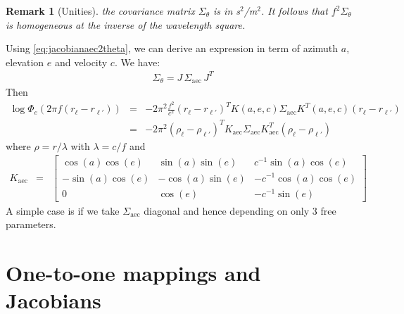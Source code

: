 \documentclass[a4paper, 12pt]{report}
\newtheorem{remark}{Remark}
\def\aec{\mathrm{aec}}
\begin{document}
\begin{remark}[Unities]
the covariance matrix $\Sigma_{\theta}$ is in s$^2$/m$^2$. It follows that $f^2 \Sigma_{\theta}$ is homogeneous at the inverse of the wavelength square.
\end{remark}


Using \eqref{eq:jacobianaec2theta}, we can derive an expression in term of azimuth $a$, elevation $e$ and velocity $c$. We have:
\begin{eqnarray}
\label{eq:theta2aec}
\Sigma_{\theta}=J\,\Sigma_{\aec}\,J^{T}
\end{eqnarray}
Then
\begin{eqnarray*}
 \log \Phi_{e}(2\pi f(r_{\ell}-r_{\ell'}))&=& 
-2\pi^2\frac{f^2}{c^2} (r_{\ell}-r_{\ell'})^TK(a,e,c)\Sigma_{\aec}K^T(a,e,c)(r_{\ell}-r_{\ell'})
\\
&=&
-2\pi^2(\rho_{\ell}-\rho_{\ell'})^TK_{\aec}\Sigma_{\aec}K^T_{\aec}(\rho_{\ell}-\rho_{\ell'})
\end{eqnarray*}
where $\rho=r/\lambda$ with $\lambda=c/f$ and
\begin{eqnarray*}
K_{\aec}&=&
\begin{bmatrix}
\cos(a)\cos(e)&\sin(a)\sin(e)&c^{-1}\sin(a)\cos(e)
\\
-\sin(a)\cos(e)&-\cos(a)\sin(e)&-c^{-1}\cos(a)\cos(e)
\\
0&\cos(e)&-c^{-1}\sin(e)
\end{bmatrix}
\end{eqnarray*}
A simple case is if we take $\Sigma_{\aec}$ diagonal and hence depending on only 3 free parameters. 







\chapter{One-to-one mappings and Jacobians}
\end{document}
